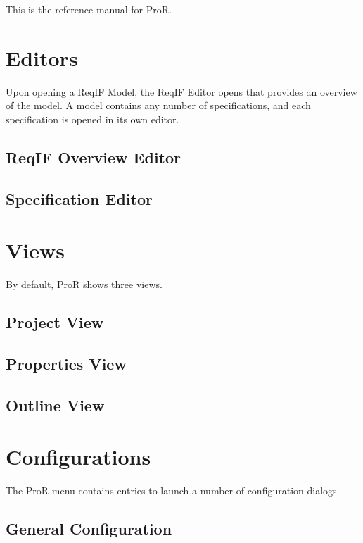 This is the reference manual for ProR.

\section{Editors}

Upon opening a ReqIF Model, the ReqIF Editor opens that provides an
overview of the model. A model contains any number of specifications,
and each specification is opened in its own editor.

\subsection{ReqIF Overview Editor}

\subsection{Specification Editor}

\section{Views}

By default, ProR shows three views.

\subsection{Project View}

\subsection{Properties View}

\subsection{Outline View}

\section{Configurations}

The ProR menu contains entries to launch a number of configuration
dialogs.

\subsection{General Configuration}

